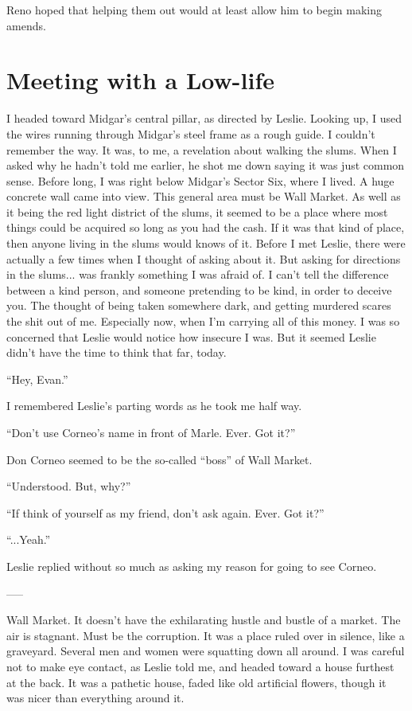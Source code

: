 \documentclass[oneside]{book}
\begin{document}
Reno hoped that helping them out would at least allow him to begin making amends.

\chapter{Meeting with a Low-life}
I headed toward Midgar’s central pillar, as directed by Leslie. Looking up, I used the wires running through Midgar’s steel frame as a rough guide. I couldn’t remember the way. It was, to me, a revelation about walking the slums. When I asked why he hadn’t told me earlier, he shot me down saying it was just common sense. Before long, I was right below Midgar’s Sector Six, where I lived. A huge concrete wall came into view. This general area must be Wall Market. As well as it being the red light district of the slums, it seemed to be a place where most things could be acquired so long as you had the cash. If it was that kind of place, then anyone living in the slums would knows of it. Before I met Leslie, there were actually a few times when I thought of asking about it. But asking for directions in the slums... was frankly something I was afraid of. I can’t tell the difference between a kind person, and someone pretending to be kind, in order to deceive you. The thought of being taken somewhere dark, and getting murdered scares the shit out of me. Especially now, when I’m carrying all of this money. I was so concerned that Leslie would notice how insecure I was. But it seemed Leslie didn’t have the time to think that far, today.

“Hey, Evan.”

I remembered Leslie’s parting words as he took me half way.

“Don’t use Corneo’s name in front of Marle. Ever. Got it?”

Don Corneo seemed to be the so-called “boss” of Wall Market.

“Understood. But, why?”

“If think of yourself as my friend, don’t ask again. Ever. Got it?”

“...Yeah.”

Leslie replied without so much as asking my reason for going to see Corneo.

—–

Wall Market. It doesn’t have the exhilarating hustle and bustle of a market. The air is stagnant. Must be the corruption. It was a place ruled over in silence, like a graveyard. Several men and women were squatting down all around. I was careful not to make eye contact, as Leslie told me, and headed toward a house furthest at the back. It was a pathetic house, faded like old artificial flowers, though it was nicer than everything around it.
\end{document}
